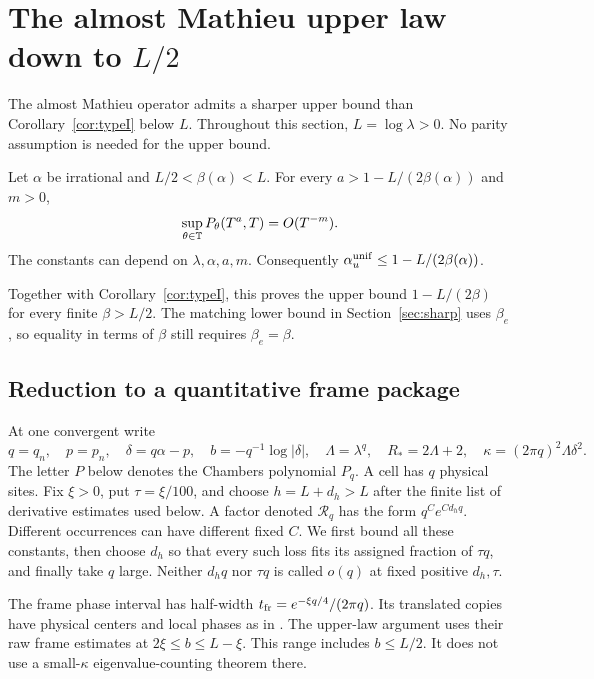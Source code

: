 \section{The almost Mathieu upper law down to \texorpdfstring{$L/2$}{L/2}}\label{sec:libration}

The almost Mathieu operator admits a sharper upper bound than
Corollary~\ref{cor:typeI} below $L$. Throughout this section,
$L=\log\lambda>0$. No parity assumption is needed for the upper bound.

\begin{theorem}\label{thm:libration}
Let $\alpha$ be irrational and $L/2<\beta(\alpha)<L$. For every
$a>1-L/(2\beta(\alpha))$ and $m>0$,
\[
 \sup_{\theta\in\mathbb T}P_\theta(T^a,T)=O(T^{-m}).
\]
The constants can depend on $\lambda,\alpha,a,m$.
Consequently $\alpha_u^{\mathrm{unif}}\le1-L/(2\beta(\alpha))$.
\end{theorem}

Together with Corollary~\ref{cor:typeI}, this proves the upper bound
$1-L/(2\beta)$ for every finite $\beta>L/2$. The matching lower bound
in Section~\ref{sec:sharp} uses $\beta_e$, so equality in terms of
$\beta$ still requires $\beta_e=\beta$.

\subsection{Reduction to a quantitative frame package}

At one convergent write
\begin{equation}\label{eq:libscale}
 q=q_n,\quad p=p_n,\quad \delta=q\alpha-p,\quad
 b=-q^{-1}\log|\delta|,\quad \Lambda=\lambda^q,\quad
 R_*=2\Lambda+2,\quad \kappa=(2\pi q)^2\Lambda\delta^2.
\end{equation}
The letter $P$ below denotes the Chambers polynomial $P_q$.
A cell has $q$ physical sites. Fix $\xi>0$, put $\tau=\xi/100$,
and choose $h=L+d_h>L$ after the finite list of derivative estimates
used below. A factor denoted $\mathcal R_q$ has the form
$q^C e^{C d_hq}$. Different occurrences can have different fixed $C$.
We first bound all these constants, then choose $d_h$ so that every
such loss fits its assigned fraction of $\tau q$, and finally take
$q$ large. Neither $d_hq$ nor $\tau q$ is called $o(q)$ at fixed
positive $d_h,\tau$.

The frame phase interval has half-width
$t_{\rm fr}=e^{-\xi q/4}/(2\pi q)$.
Its translated copies have physical centers and local phases as in
\cite[Appendix C, Covariance and well density]{DMband}.
The upper-law argument uses their raw frame estimates at
$2\xi\le b\le L-\xi$. This range includes $b\le L/2$.
It does not use a small-$\kappa$ eigenvalue-counting theorem there.

